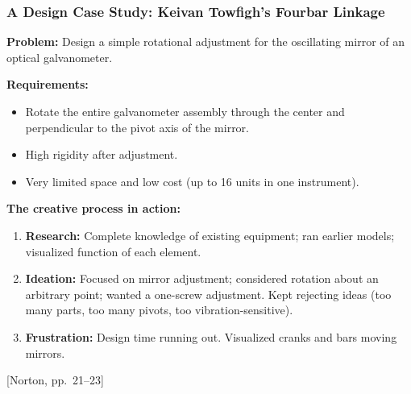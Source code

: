 \documentclass[10pt,aspectratio=43]{beamer}
\newcommand{\pref}[1]{\vfill\hfill{\scriptsize\color{gray}[Norton, pp.~#1]}}
\begin{document}

\begin{frame}
\frametitle{A Design Case Study: Keivan Towfigh's Fourbar Linkage}

\textbf{Problem:} Design a simple rotational adjustment for the oscillating mirror of an optical galvanometer.

\vspace{4pt}
\textbf{Requirements:}
\begin{itemize}
  \item Rotate the entire galvanometer assembly through the center and perpendicular to the pivot axis of the mirror.
  \item High rigidity after adjustment.
  \item Very limited space and low cost (up to 16 units in one instrument).
\end{itemize}

\vspace{6pt}
\textbf{The creative process in action:}
\begin{enumerate}
  \item \textbf{Research:} Complete knowledge of existing equipment; ran earlier models; visualized function of each element.
  \item \textbf{Ideation:} Focused on mirror adjustment; considered rotation about an arbitrary point; wanted a one-screw adjustment. Kept rejecting ideas (too many parts, too many pivots, too vibration-sensitive).
  \item \textbf{Frustration:} Design time running out. Visualized cranks and bars moving mirrors.
\end{enumerate}
\pref{21--23}
\end{frame}
\end{document}
